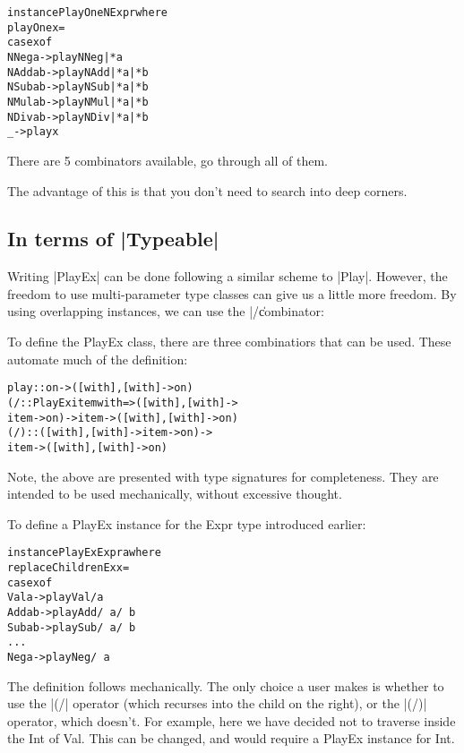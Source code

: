 \documentclass[preprint]{sigplanconf}
\newenvironment{code}{\begin{alltt}\small}{\end{alltt}}
\begin{document}
\begin{code}
instance PlayOne NExpr where
    playOne x =
        case x of
            NNeg  a    -> play NNeg |* a
            NAdd  a b  -> play NAdd |* a |* b
            NSub  a b  -> play NSub |* a |* b
            NMul  a b  -> play NMul |* a |* b
            NDiv  a b  -> play NDiv |* a |* b
            _          -> play x
\end{code}

There are 5 combinators available, go through all of them.

The advantage of this is that you don't need to search into deep corners.


\subsection{In terms of |Typeable|}

Writing |PlayEx| can be done following a similar scheme to |Play|. However, the freedom to use multi-parameter type classes can give us a little more freedom. By using overlapping instances, we can use the |/\| combinator:


To define the PlayEx class, there are three combinatiors that can be used. These automate much of the definition:

\begin{code}
play :: on -> ([with],[with] -> on)
(/\) :: PlayEx item with => ([with], [with] ->
    item -> on) -> item -> ([with], [with] -> on)
(/\!) :: ([with], [with] -> item -> on) ->
    item -> ([with], [with] -> on)
\end{code}

Note, the above are presented with type signatures for completeness. They are intended to be used mechanically, without excessive thought.

To define a PlayEx instance for the Expr type introduced earlier:

\begin{code}
instance PlayEx Expr a where
    replaceChildrenEx x =
        case x of
            Val a -> play Val /\! a
            Add a b -> play Add /\ a /\ b
            Sub a b -> play Sub /\ a /\ b
            ...
            Neg a -> play Neg /\ a
\end{code}

The definition follows mechanically. The only choice a user makes is whether to use the |(/\)| operator (which recurses into the child on the right), or the |(/\!)| operator, which doesn't. For example, here we have decided not to traverse inside the Int of Val. This can be changed, and would require a PlayEx instance for Int.
\end{document}
